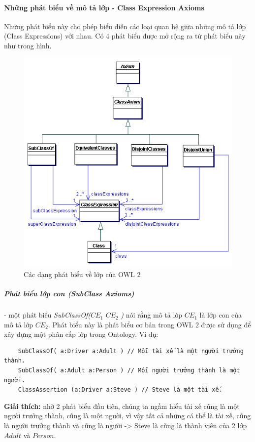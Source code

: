 	\paragraph{Những phát biểu về mô tả lớp - Class Expression Axioms}
	Những phát biểu này cho phép biểu diễn các loại quan hệ giữa những mô tả lớp (Class Expressions) với nhau. Có 4 phát biểu được mở rộng ra từ phát biểu này như trong hình.
	\begin{figure}[!h]
		\centering
		\includegraphics[width=120mm]{Figures/classAxiom.png}
		\caption{Các dạng phát biểu về lớp của OWL 2\label{overflow}}
	\end{figure}
	
	\subparagraph{Phát biểu lớp con (SubClass Axioms)} - một phát biểu \textit{SubClassOf(}$CE_{1}$ $CE_{2}$ \textit{)} nói rằng mô tả lớp $CE_{1}$ là lớp con của mô tả lớp $CE_{2}$. Phát biểu này là phát biểu cơ bản trong OWL 2 được sử dụng để xây dựng một phân cấp lớp trong Ontology. Ví dụ:
	\begin{verbatim}
	SubClassOf( a:Driver a:Adult ) // Mỗi tài xế là một người trưởng thành.
	SubClassOf( a:Adult a:Person ) // Mỗi người trưởng thành là một người.
	ClassAssertion (a:Driver a:Steve ) // Steve là một tài xế.
	\end{verbatim}
	\textbf{Giải thích:} nhờ 2 phát biểu đầu tiên, chúng ta ngầm hiểu tài xế cũng là một người trưởng thành, cũng là một người, vì vậy tất cả những cá thể là tài xế, cũng là người trưởng thành và cũng là người -> Steve là cũng là thành viên của 2 lớp $Adult$ và $Person$.
	

